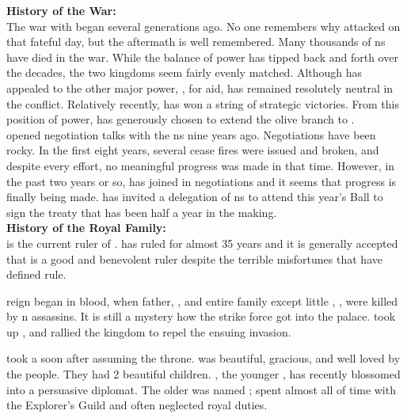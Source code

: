 \documentclass[blue]{NeptuneBall}
\begin{document}
\name{\bAtlantican{}}



{\bf History of the War:}\\
The war with \pPacifica{} began several generations ago. No one remembers why \pPacifica{} attacked on that fateful day, but the aftermath is well remembered. Many thousands of \pAtlantis{}ns have died in the war. While the balance of power has tipped back and forth over the decades, the two kingdoms seem fairly evenly matched. Although \pAtlantis{} has appealed to the other major power, \pIndia{}, for aid, \pIndia{} has remained resolutely neutral in the conflict. Relatively recently, \pAtlantis{} has won a string of strategic victories. From this position of power, \cKing{\King} \cKing{} has generously chosen to extend the olive branch to \pPacifica{}.\\

\cKing{\King} \cKing{} opened negotiation talks with the \pPacifica{}ns nine years ago. Negotiations have been rocky. In the first eight years, several cease fires were issued and broken, and despite every effort, no meaningful progress was made in that time. However, in the past two years or so, \cPrincess{\Prince} \cPrincess{} has joined \cPrincess{\their} \cKing{\parent} in negotiations and it seems that progress is finally being made. \cKing{\King} \cKing{} has  invited a delegation of \pPacifica{}ns to attend this year's \cExExKing{} Ball to sign the treaty that has been half a year in the making.\\


{\bf History of the Royal Family:}\\
\cKing{\King} \cKing{} is the current ruler of \pAtlantis{}. \cKing{\They} has ruled for almost 35 years and it is generally accepted that \cKing{\they} is a good and benevolent ruler despite the terrible misfortunes that have defined \cKing{\their} rule.

\cKing{\Their} reign began in blood, when \cKing{\their} father, \cExKing{\King} \cExKing{}, and \cKing{\their} entire family except \cKing{\their} little \cPlant{\sibling}, \cPlant{}, were killed by \pPacifica{}n assassins. It is still a mystery how the strike force got into the palace. \cKing{} took up \iTrident{\MYname{}}, and rallied the kingdom to repel the ensuing invasion.

\cKing{\King} \cKing{} took a \cQueen{\spouse} soon after assuming the throne. \cQueen{\King} \cQueen{} was beautiful, gracious, and well loved by the people. They had 2 beautiful children. \cPrincess{\Prince} \cPrincess{}, the younger \cPrincess{\offspring}, has recently blossomed into a persuasive diplomat. The older \cAriel{\Prince} was named \cAriel{}; \cAriel{} spent almost all of \cAriel{\their} time with the Explorer's Guild and often neglected \cAriel{\their} royal duties. 
\end{document}
